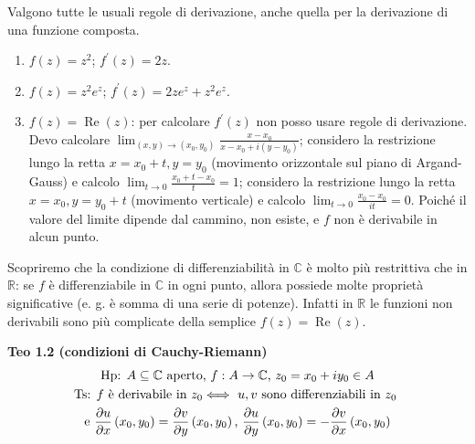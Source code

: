 \documentclass{article}
\begin{document}
Valgono tutte le usuali regole di derivazione, anche quella per la
derivazione di una funzione composta.

\begin{enumerate}
\item $f\left( z\right) =z^{2}$; $f^{\prime }\left( z\right) =2z$.

\item $f\left( z\right) =z^{2}e^{z}$; $f^{\prime }\left( z\right)
=2ze^{z}+z^{2}e^{z}$.

\item $f\left( z\right) =\operatorname{Re}(z)$: per calcolare $f^{\prime }\left(
z\right) $ non posso usare regole di derivazione. Devo calcolare $%
\lim_{\left( x,y\right) \rightarrow \left( x_{0},y_{0}\right) }\frac{x-x_{0}%
}{x-x_{0}+i\left( y-y_{0}\right) }$; considero la restrizione lungo la retta 
$x=x_{0}+t,y=y_{0}$ (movimento orizzontale sul piano di Argand-Gauss) e
calcolo $\lim_{t\rightarrow 0}\frac{x_{0}+t-x_{0}}{t}=1$; considero la
restrizione lungo la retta $x=x_{0},y=y_{0}+t$ (movimento verticale) e
calcolo $\lim_{t\rightarrow 0}\frac{x_{0}-x_{0}}{it}=0$. Poich\'{e} il
valore del limite dipende dal cammino, non esiste, e $f$ non \`{e}
derivabile in alcun punto.
\end{enumerate}

Scopriremo che la condizione di differenziabilit\`{a} in $%
\mathbb{C}
$ \`{e} molto pi\`{u} restrittiva che in $%
\mathbb{R}
$: se $f$ \`{e} differenziabile in $%
\mathbb{C}
$ in ogni punto, allora possiede molte propriet\`{a} significative (e. g. 
\`{e} somma di una serie di potenze). Infatti in $%
\mathbb{R}
$ le funzioni non derivabili sono pi\`{u} complicate della semplice $f\left(
z\right) =\operatorname{Re}(z)$.

\textbf{Teo 1.2 (condizioni di Cauchy-Riemann)}%
\begin{gather*}
\text{Hp: }A\subseteq 
\mathbb{C}
\text{ aperto, }f:A\rightarrow 
\mathbb{C}
\text{, }z_{0}=x_{0}+iy_{0}\in A \\
\text{Ts: }f\text{ \`{e} derivabile in }z_{0}\Longleftrightarrow \text{ }u,v%
\text{ sono differenziabili in }z_{0}\text{ } \\
\text{e }\frac{\partial u}{\partial x}\left( x_{0},y_{0}\right) =\frac{%
\partial v}{\partial y}\left( x_{0},y_{0}\right) \text{, }\frac{\partial u}{%
\partial y}\left( x_{0},y_{0}\right) =-\frac{\partial v}{\partial x}\left(
x_{0},y_{0}\right)
\end{gather*}
\end{document}
